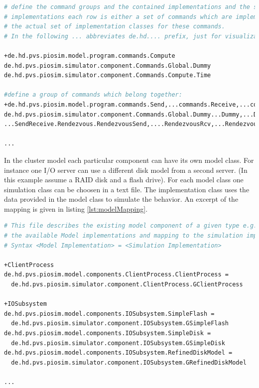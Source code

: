 \documentclass[
     11pt,         %
     a4paper,      %
     BCOR10mm,     %
     DIV14,        %
     liststotoc,   %
     bibtotoc,     %
     idxtotoc,     %
     parskip       %
     ]{scrreprt}   %
\begin{document}
\begin{lstlisting}[numbers=none,caption=CommandToSimulationMapper.txt,label=lst:commandMapping,language=Perl,basicstyle=\ttfamily\scriptsize]
# define the command groups and the contained implementations and the simulator
# implementations each row is either a set of commands which are implemented or
# the actual set of implementation classes for these commands.
# In the following ... abbreviates de.hd.... prefix, just for visualization!

+de.hd.pvs.piosim.model.program.commands.Compute
de.hd.pvs.piosim.simulator.component.Commands.Global.Dummy
de.hd.pvs.piosim.simulator.component.Commands.Compute.Time

#define a group of commands which belong together:
+de.hd.pvs.piosim.model.program.commands.Send,...commands.Receive,...commands.Sendrecv
de.hd.pvs.piosim.simulator.component.Commands.Global.Dummy...Dummy,...Dummy
...SendReceive.Rendezvous.RendezvousSend,....RendezvousRcv,...RendezvousSendrecv

...
\end{lstlisting}

In the cluster model each particular component can have its own model class.
For instance one I/O server can use a different disk model from a second server. (In this example
assume a RAID disk and a flash drive).
For each model class one simulation class can be choosen in a text file. The implementation class
uses the data provided in the model class to simulate the behavior.
An excerpt of the mapping is given in listing \ref{lst:modelMapping}.

\begin{lstlisting}[numbers=none,caption=ModelToSimulationMapper.txt,label=lst:modelMapping,language=Perl,basicstyle=\ttfamily\scriptsize]
# This file describes the existing model component of a given type e.g. "Node"
# the available Model implementations and mapping to the simulation implementation.
# Syntax <Model Implementation> = <Simulation Implementation>

+ClientProcess
de.hd.pvs.piosim.model.components.ClientProcess.ClientProcess =
  de.hd.pvs.piosim.simulator.component.ClientProcess.GClientProcess

+IOSubsystem
de.hd.pvs.piosim.model.components.IOSubsystem.SimpleFlash =
  de.hd.pvs.piosim.simulator.component.IOSubsystem.GSimpleFlash
de.hd.pvs.piosim.model.components.IOSubsystem.SimpleDisk =
  de.hd.pvs.piosim.simulator.component.IOSubsystem.GSimpleDisk
de.hd.pvs.piosim.model.components.IOSubsystem.RefinedDiskModel =
  de.hd.pvs.piosim.simulator.component.IOSubsystem.GRefinedDiskModel

...
\end{lstlisting}
\end{document}
